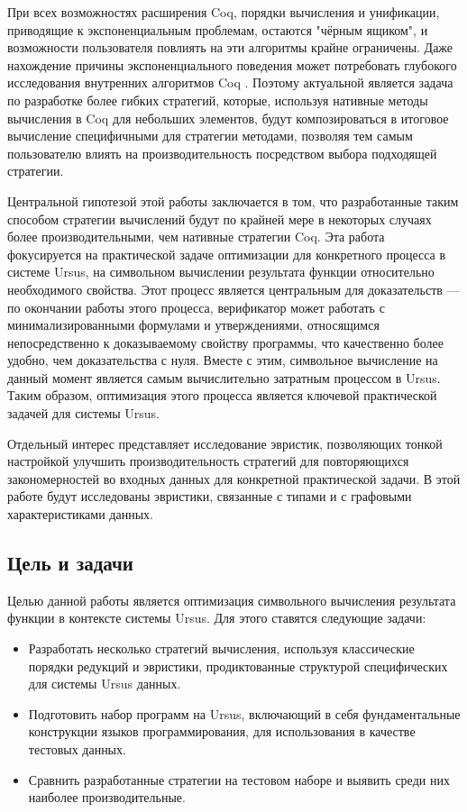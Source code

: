 \documentclass[../thesis.tex]{subfiles}
\begin{document}
При всех возможностях расширения Coq, порядки вычисления и унификации, приводящие к экспоненциальным проблемам, остаются "чёрным ящиком", и возможности пользователя повлиять на эти алгоритмы крайне ограничены. Даже нахождение причины экспоненциального поведения может потребовать глубокого исследования внутренних алгоритмов Coq \cite{gross_phd}. Поэтому актуальной является задача по разработке более гибких стратегий, которые, используя нативные методы вычисления в Coq для небольших элементов, будут композироваться в итоговое вычисление специфичными для стратегии методами, позволяя тем самым пользователю влиять на производительность посредством выбора подходящей стратегии.

Центральной гипотезой этой работы заключается в том, что разработанные таким способом стратегии вычислений будут по крайней мере в некоторых случаях более производительными, чем нативные стратегии Coq. Эта работа фокусируется на практической задаче оптимизации для конкретного процесса в системе Ursus, на символьном вычислении результата функции относительно необходимого свойства. Этот процесс является центральным для доказательств --- по окончании работы этого процесса, верификатор может работать с минимализированными формулами и утверждениями, относящимся непосредственно к доказываемому свойству программы, что качественно более удобно, чем доказательства с нуля. Вместе с этим, символьное вычисление на данный момент является самым вычислительно затратным процессом в Ursus. Таким образом, оптимизация этого процесса является ключевой практической задачей для системы Ursus.

Отдельный интерес представляет исследование эвристик, позволяющих тонкой настройкой улучшить производительность стратегий для повторяющихся закономерностей во входных данных для конкретной практической задачи. В этой работе будут исследованы эвристики, связанные с типами и с графовыми характеристиками данных.

\subsection*{Цель и задачи}

Целью данной работы является оптимизация символьного вычисления результата функции в контексте системы Ursus. Для этого ставятся следующие задачи:

\begin{itemize}
	\item Разработать несколько стратегий вычисления, используя классические порядки редукций и эвристики, продиктованные структурой специфических для системы Ursus данных.
	\item Подготовить набор программ на Ursus, включающий в себя фундаментальные конструкции языков программирования, для использования в качестве тестовых данных.
	\item Сравнить разработанные стратегии на тестовом наборе и выявить среди них наиболее производительные.
\end{itemize}
\end{document}
